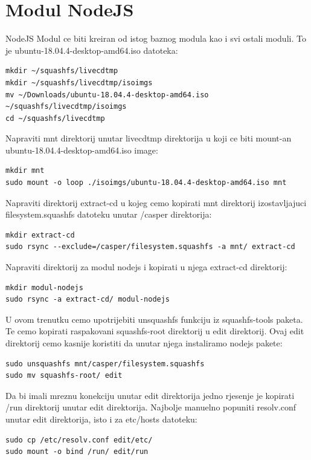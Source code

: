 \documentclass[12pt,vi]{mitthesis}
\begin{document}
\chapter*{Modul NodeJS}
NodeJS Modul ce biti kreiran od istog baznog modula kao i svi ostali moduli. To je ubuntu-18.04.4-desktop-amd64.iso datoteka:
\begin{lstlisting}[style=BashInputStyle]
mkdir ~/squashfs/livecdtmp
mkdir ~/squashfs/livecdtmp/isoimgs
mv ~/Downloads/ubuntu-18.04.4-desktop-amd64.iso ~/squashfs/livecdtmp/isoimgs
cd ~/squashfs/livecdtmp
\end{lstlisting}

\noindent
Napraviti mnt direktorij unutar livecdtmp direktorija u koji ce biti mount-an ubuntu-18.04.4-desktop-amd64.iso image:
\begin{lstlisting}[style=BashInputStyle]
mkdir mnt
sudo mount -o loop ./isoimgs/ubuntu-18.04.4-desktop-amd64.iso mnt
\end{lstlisting}

\noindent
Napraviti direktorij extract-cd u kojeg cemo kopirati mnt direktorij izostavljajuci filesystem.squashfs datoteku unutar /casper direktorija:
\begin{lstlisting}[style=BashInputStyle]
mkdir extract-cd
sudo rsync --exclude=/casper/filesystem.squashfs -a mnt/ extract-cd
\end{lstlisting}

\noindent
Napraviti direktorij za modul nodejs i kopirati u njega extract-cd direktorij:
\begin{lstlisting}[style=BashInputStyle]
mkdir modul-nodejs
sudo rsync -a extract-cd/ modul-nodejs
\end{lstlisting}

\noindent
U ovom trenutku cemo upotrijebiti unsquashfs funkciju iz squashfs-tools paketa. Te cemo kopirati raspakovani squashfs-root direktorij u edit direktorij. Ovaj edit direktorij cemo kasnije koristiti da unutar njega instaliramo nodejs pakete:
\begin{lstlisting}[style=BashInputStyle]
sudo unsquashfs mnt/casper/filesystem.squashfs
sudo mv squashfs-root/ edit
\end{lstlisting}

\noindent
Da bi imali mreznu konekciju unutar edit direktorija jedno rjesenje je kopirati /run direktorij unutar edit direktorija.
Najbolje manuelno popuniti resolv.conf unutar edit direktorija, isto i za etc/hosts datoteku:
\begin{lstlisting}[style=BashInputStyle]
sudo cp /etc/resolv.conf edit/etc/
sudo mount -o bind /run/ edit/run
\end{lstlisting}
\end{document}
